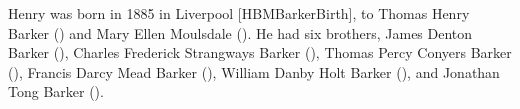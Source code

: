 
Henry was born in 1885 in Liverpool [HBMBarkerBirth],  to Thomas Henry Barker () and Mary Ellen Moulsdale ()\cite{HBMBarkerBirth}. He had six brothers,  James Denton Barker (), Charles Frederick Strangways Barker (), Thomas Percy Conyers Barker (), Francis Darcy Mead Barker (), William Danby Holt Barker (), and Jonathan Tong Barker ().

